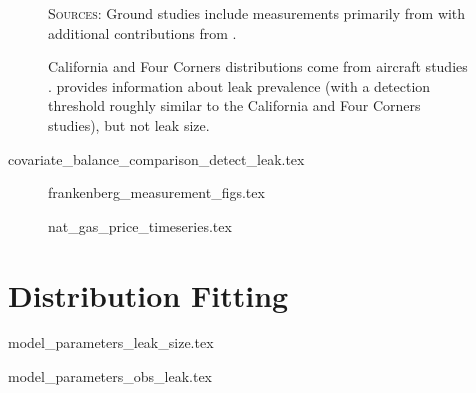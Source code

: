 \documentclass[12pt,oneside,letterpaper]{article}
\theoremstyle{definition}
\begin{document}
\begin{refsection}
\begin{figure}[!bth]
\textsc{Sources:}
Ground studies include measurements primarily from
\textcite{Robertson/Edie/Snare/Soltis/Field/Burkhart/Bell/Zimmerle/Murphy:2017}
with additional contributions from
\textcite{
Rella/Tsai/Botkin/Crosson/Steele:2015,
Omara/Sullivan/Li/Subramanian/Robinson/Presto:2016,
Omara/Zimmerman/Sullivan/Li/Ellis/Cesa/Subramanian/Presto/Robinson:2018,
}.

California and Four Corners distributions come from aircraft studies \parencite{Duren/etal:2019, Frankenberg/etal:2016}.
\textcite{Lyon/Alvarez/Zavala-Araiza/Brandt/Jackson/Hamburg:2016}
provides information about leak prevalence (with a detection threshold roughly similar to the California and Four Corners studies), but not leak size.
\end{figure}



\begin{table}[!bth] %
{covariate_balance_comparison_detect_leak.tex}
\end{table}


\begin{figure}[!hbt] %
{frankenberg_measurement_figs.tex}
\end{figure}


\begin{figure}[!hbt] %
{nat_gas_price_timeseries.tex}
\end{figure}





\newpage

\section{Distribution Fitting}
\label{app:distribution-fitting}

\begin{table}[!bth]
\centering
{model_parameters_leak_size.tex}
\end{table}

\begin{table}[!bth]
\centering
{model_parameters_obs_leak.tex}
\end{table}




\end{refsection}
\end{document}
